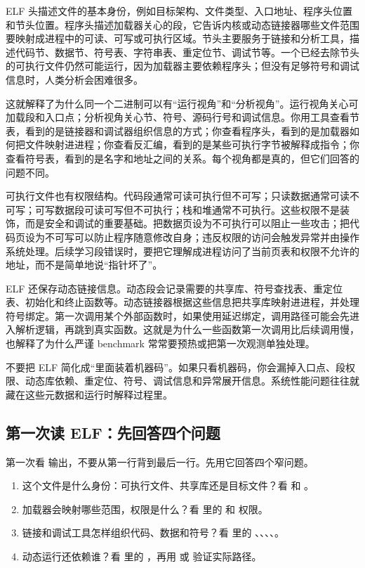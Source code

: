 ELF 头描述文件的基本身份，例如目标架构、文件类型、入口地址、程序头位置和节头位置。程序头描述加载器关心的段，它告诉内核或动态链接器哪些文件范围要映射成进程中的可读、可写或可执行区域。节头主要服务于链接和分析工具，描述代码节、数据节、符号表、字符串表、重定位节、调试节等。一个已经去除节头的可执行文件仍然可能运行，因为加载器主要依赖程序头；但没有足够符号和调试信息时，人类分析会困难很多。

这就解释了为什么同一个二进制可以有“运行视角”和“分析视角”。运行视角关心可加载段和入口点；分析视角关心节、符号、源码行号和调试信息。你用工具查看节表，看到的是链接器和调试器组织信息的方式；你查看程序头，看到的是加载器如何把文件映射进进程；你查看反汇编，看到的是某些可执行字节被解释成指令；你查看符号表，看到的是名字和地址之间的关系。每个视角都是真的，但它们回答的问题不同。

可执行文件也有权限结构。代码段通常可读可执行但不可写；只读数据通常可读不可写；可写数据段可读可写但不可执行；栈和堆通常不可执行。这些权限不是装饰，而是安全和调试的重要基础。把数据页设为不可执行可以阻止一些攻击；把代码页设为不可写可以防止程序随意修改自身；违反权限的访问会触发异常并由操作系统处理。后续学习段错误时，要把它理解成进程访问了当前页表和权限不允许的地址，而不是简单地说“指针坏了”。

ELF 还保存动态链接信息。动态段会记录需要的共享库、符号查找表、重定位表、初始化和终止函数等。动态链接器根据这些信息把共享库映射进进程，并处理符号绑定。第一次调用某个外部函数时，如果使用延迟绑定，调用路径可能会先进入解析逻辑，再跳到真实函数。这就是为什么一些函数第一次调用比后续调用慢，也解释了为什么严谨 benchmark 常常要预热或把第一次观测单独处理。

\begin{warningbox}
不要把 ELF 简化成“里面装着机器码”。如果只看机器码，你会漏掉入口点、段权限、动态库依赖、重定位、符号、调试信息和异常展开信息。系统性能问题往往就藏在这些元数据和运行时解释过程里。
\end{warningbox}

\subsection{第一次读 ELF：先回答四个问题}

第一次看  输出，不要从第一行背到最后一行。先用它回答四个窄问题。

\begin{enumerate}
  \item 这个文件是什么身份：可执行文件、共享库还是目标文件？看  和 。
  \item 加载器会映射哪些范围，权限是什么？看  里的  和  权限。
  \item 链接和调试工具怎样组织代码、数据和符号？看  里的 、、、、。
  \item 动态运行还依赖谁？看  里的 ，再用  或  验证实际路径。
\end{enumerate}

